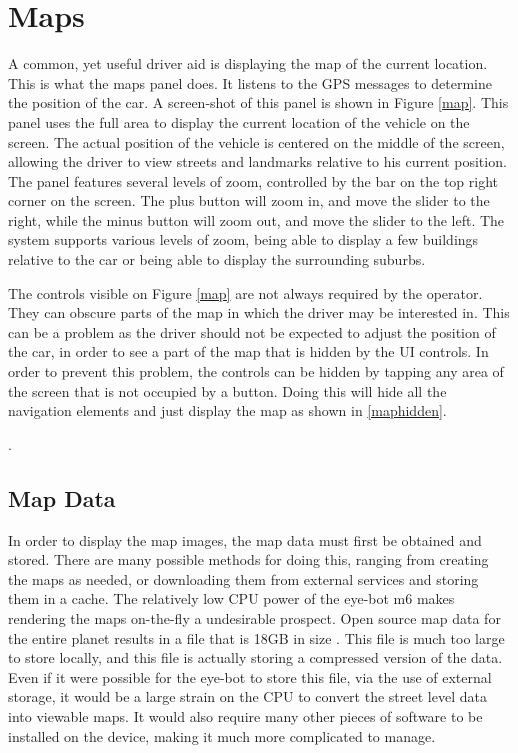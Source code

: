 

\section{Maps}
\label{sec:maps}
A common, yet useful driver aid is displaying the map of the current location. This is what the maps panel does. It listens to the GPS messages to determine the position of the car. A screen-shot of this panel is shown in Figure \ref{map}. This panel uses the full area to display the current location of the vehicle on the screen. The actual position of the vehicle is centered on the middle of the screen, allowing the driver to view streets and landmarks relative to his current position. The panel features several levels of zoom, controlled by the bar on the top right corner on the screen. The plus button will zoom in, and move the slider to the right, while the minus button will zoom out, and move the slider to the left. The system supports various levels of zoom, being able to display a few buildings relative to the car or being able to display the surrounding suburbs.


The controls visible on Figure \ref{map} are not always required by the operator. They can obscure parts of the map in which the driver may be interested in. This can be a problem as the driver should not be expected to adjust the position of the car, in order to see a part of the map that is hidden by the UI controls. In order to prevent this problem, the controls can be hidden by tapping any area of the screen that is not occupied by a button. Doing this will hide all the navigation elements and just display the map as shown in \ref{maphidden}.

.


\subsection{Map Data}

In order to display the map images, the map data must first be obtained and stored. There are many possible methods for doing this, ranging from creating the maps as needed, or downloading them from external services and storing them in a cache. The relatively low CPU power of the eye-bot m6 makes rendering the maps on-the-fly a undesirable prospect. Open source map data for the entire planet results in a file that is 18GB in size \cite{planet_osm}. This file is much too large to store locally, and this file is actually storing a compressed version of the data. Even if it were possible for the eye-bot to store this file, via the use of external storage, it would be a large strain on the CPU to convert the street level data into viewable maps. It would also require many other pieces of software to be installed on the device, making it much more complicated to manage.

